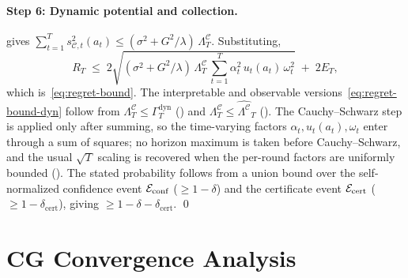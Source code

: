 \documentclass[twoside]{article}
\newcommand{\Calg}{\mathcal{C}}                 %
\newcommand{\Lamalg}{\Lambda^{\Calg}}           %
\newcommand{\Gamdyn}{\Gamma^{\mathrm{dyn}}}     %
\begin{document}
\paragraph{Step 6: Dynamic potential and collection.}
 gives
$\sum_{t=1}^T s_{\Calg,t}^2(a_t)\le(\sigma^2+G^2/\lambda)\,\Lamalg_T$.
Substituting,
\[
  R_T
  \;\le\;
  2\sqrt{(\sigma^2+G^2/\lambda)\,\Lamalg_T\,
    \sum_{t=1}^T \alpha_t^2\,u_t(a_t)\,\omega_t^2} \;+\; 2E_T,
\]
which is~\eqref{eq:regret-bound}.  The interpretable and observable
versions~\eqref{eq:regret-bound-dyn} follow from $\Lamalg_T\le\Gamdyn_T$
() and $\Lamalg_T\le\widehat{\Lamalg}_T$
().  The Cauchy--Schwarz step is applied only after
summing, so the time-varying factors $\alpha_t,u_t(a_t),\omega_t$ enter
through a sum of squares; no horizon maximum is taken before Cauchy--Schwarz, and
the usual $\sqrt{T}$ scaling is recovered when the per-round factors are
uniformly bounded ().  The stated probability follows from a
union bound over the self-normalized confidence event
$\mathcal{E}_{\mathrm{conf}}$ ($\ge 1-\delta$) and the certificate event
$\mathcal{E}_{\mathrm{cert}}$ ($\ge 1-\delta_{\mathrm{cert}}$), giving
$\ge 1-\delta-\delta_{\mathrm{cert}}$.
\qed

\section{CG Convergence Analysis}\label{app:cg}
\end{document}
